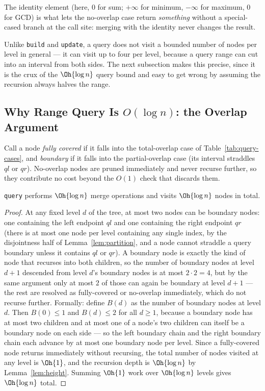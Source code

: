 \begin{keyidea}
The identity element (here, $0$ for sum; $+\infty$ for minimum, $-\infty$ for maximum, $0$ for GCD) is what lets the no-overlap case return \emph{something} without a special-cased branch at the call site: merging with the identity never changes the result.
\end{keyidea}

Unlike \texttt{build} and \texttt{update}, a query does not visit a bounded number of nodes per level in general --- it can visit up to four per level, because a query range can cut into an interval from both sides. The next subsection makes this precise, since it is the crux of the $\Oh{\log n}$ query bound and easy to get wrong by assuming the recursion always halves the range.

\subsection{Why Range Query Is \texorpdfstring{$O(\log n)$}{O(log n)}: the Overlap Argument}
\label{sec:overlap-argument}
Call a node \emph{fully covered} if it falls into the total-overlap case of Table~\ref{tab:query-cases}, and \emph{boundary} if it falls into the partial-overlap case (its interval straddles $ql$ or $qr$). No-overlap nodes are pruned immediately and never recurse further, so they contribute no cost beyond the $O(1)$ check that discards them.

\begin{thm}\label{thm:query-time}
\texttt{query} performs $\Oh{\log n}$ merge operations and visits $\Oh{\log n}$ nodes in total.
\end{thm}
\begin{proof}
At any fixed level $d$ of the tree, at most two nodes can be boundary nodes: one containing the left endpoint $ql$ and one containing the right endpoint $qr$ (there is at most one node per level containing any single index, by the disjointness half of Lemma~\ref{lem:partition}, and a node cannot straddle a query boundary unless it contains $ql$ or $qr$). A boundary node is exactly the kind of node that recurses into both children, so the number of boundary nodes at level $d+1$ descended from level $d$'s boundary nodes is at most $2\cdot 2 = 4$, but by the same argument only at most $2$ of those can again be boundary at level $d+1$ --- the rest are resolved as fully-covered or no-overlap immediately, which do not recurse further. Formally: define $B(d)$ as the number of boundary nodes at level $d$. Then $B(0)\le 1$ and $B(d)\le 2$ for all $d\ge 1$, because a boundary node has at most two children and at most one of a node's two children can itself be a boundary node on each side --- so the left boundary chain and the right boundary chain each advance by at most one boundary node per level. Since a fully-covered node returns immediately without recursing, the total number of nodes visited at any level is $\Oh{1}$, and the recursion depth is $\Oh{\log n}$ by Lemma~\ref{lem:height}. Summing $\Oh{1}$ work over $\Oh{\log n}$ levels gives $\Oh{\log n}$ total.
\end{proof}

